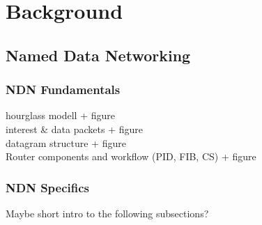 \chapter{Background} \label{chapter:Background}



\section{Named Data Networking}

\subsection{NDN Fundamentals}
hourglass modell + figure \\
interest \& data packets + figure \\
datagram structure + figure \\
Router components and workflow (PID, FIB, CS) + figure \\

\subsection{NDN Specifics}
Maybe short intro to the following subsections?

